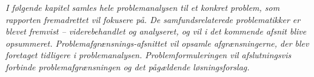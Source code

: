 \textit{I følgende kapitel samles hele problemanalysen til et konkret problem, som rapporten fremadrettet vil fokusere på. De samfundsrelaterede problematikker er blevet fremvist – viderebehandlet og analyseret, og vil i det kommende afsnit blive opsummeret. Problemafgrænsnings-afsnittet vil opsamle afgrænsningerne, der blev foretaget tidligere i problemanalysen. Problemformuleringen vil afslutningsvis forbinde problemafgrænsningen og det pågældende løsningsforslag.}